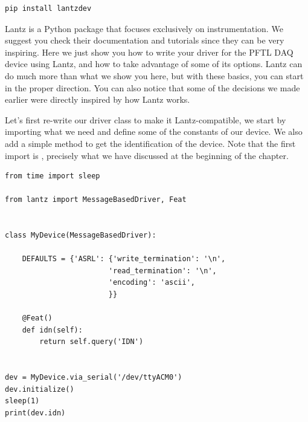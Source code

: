 \begin{verbatim}
pip install lantzdev
\end{verbatim}


Lantz is a Python package that focuses exclusively on instrumentation. We suggest you check their documentation and tutorials since they can be very inspiring. Here we just show you how to write your driver for the {PFTL DAQ} device using Lantz, and how to take advantage of some of its options. Lantz can do much more than what we show you here, but with these basics, you can start in the proper direction. You can also notice that some of the decisions we made earlier were directly inspired by how Lantz works.

Let's first re-write our driver class to make it Lantz-compatible, we start by importing what we need and define some of the constants of our device. We also add a simple method to get the identification of the device. Note that the first import is , precisely what we have discussed at the beginning of the chapter.

\begin{verbatim}
from time import sleep

from lantz import MessageBasedDriver, Feat


class MyDevice(MessageBasedDriver):

    DEFAULTS = {'ASRL': {'write_termination': '\n',
                        'read_termination': '\n',
                        'encoding': 'ascii',
                        }}

    @Feat()
    def idn(self):
        return self.query('IDN')


dev = MyDevice.via_serial('/dev/ttyACM0')
dev.initialize()
sleep(1)
print(dev.idn)
\end{verbatim}

